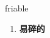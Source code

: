 
\begin{frame}
{\huge friable}
\begin{center}
\begin{enumerate}\Large
  \item \textbf{易碎的}
\end{enumerate}
\end{center}
\end{frame}
